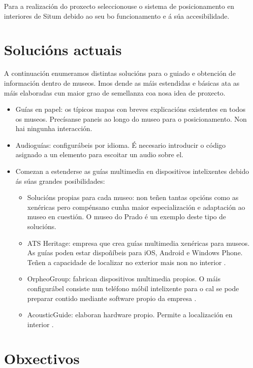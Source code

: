 Para a realización do proxecto seleccionouse o sistema de posicionamento en interiores de Situm debido ao seu bo funcionamento e á súa accesibilidade.

\section{Solucións actuais}

A continuación enumeramos distintas solucións para o guiado e obtención de información dentro de museos. Imos dende as máis estendidas e básicas ata as máis elaboradas cun maior grao de semellanza coa nosa idea de proxecto.
\begin{itemize}
	\item Guías en papel: os típicos mapas con breves explicacións existentes en todos os museos. Precísanse paneis ao longo do museo para o posicionamento. Non hai ningunha interacción.
	\item Audioguías: configurábeis por idioma. É necesario introducir o código asignado a un elemento para escoitar un audio sobre el.
	\item Comezan a estenderse as guías multimedia en dispositivos intelixentes debido ás súas grandes posibilidades:
	\begin{itemize}
		\item Solucións propias para cada museo: non teñen tantas opcións como as xenéricas pero compénsano cunha maior especialización e adaptación ao museo en cuestión. O museo do Prado é un exemplo deste tipo de solucións.
		\item ATS Heritage: empresa que crea guías multimedia xenéricas para museos. As guías poden estar dispoñíbeis para iOS, Android e Windows Phone. Teñen a capacidade de localizar no exterior mais non no interior \cite{atsHeritage}.
		\item OrpheoGroup: fabrican dispositivos multimedia propios. O máis configurábel consiste nun teléfono móbil intelixente para o cal se pode preparar contido mediante software propio da empresa \cite{orpheoGroup}.
		\item AcousticGuide: elaboran hardware propio. Permite a localización en interior \cite{acousticGuide}.
	\end{itemize}
\end{itemize}

\section{Obxectivos}

